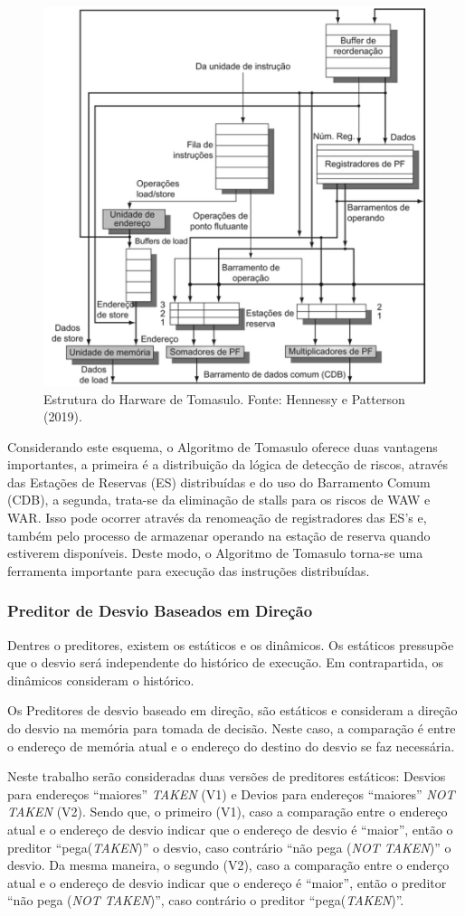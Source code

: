 \documentclass[12pt]{article}
\begin{document}
\begin{figure}[h]
  \centering
  \includegraphics[width=.6\textwidth]{img/fig_tomasulo.png}
  \caption{Estrutura do Harware de Tomasulo. Fonte: Hennessy e Patterson (2019).}
  \label{fig_tomasulo}
\end{figure}


Considerando este esquema, o Algoritmo de Tomasulo oferece duas vantagens importantes, a primeira é a distribuição da lógica de detecção de riscos, através das Estações de Reservas (ES) distribuídas e do uso do Barramento Comum (CDB), a segunda, trata-se da eliminação de stalls para os riscos de WAW e WAR. Isso pode ocorrer através da renomeação de registradores das ES's e, também pelo processo de armazenar operando na estação de reserva quando estiverem disponíveis. Deste modo, o Algoritmo de Tomasulo torna-se uma ferramenta importante para execução das instruções distribuídas.

\subsubsection{Preditor de Desvio Baseados em Direção} \label{sec:secao_desvio}

Dentres o preditores, existem os estáticos e os dinâmicos. Os estáticos pressupõe que o desvio será independente do histórico de execução. Em contrapartida, os dinâmicos consideram o histórico.

Os Preditores de desvio baseado em direção, são estáticos e consideram a direção do desvio na memória para tomada de decisão. Neste caso, a comparação é entre o endereço de memória atual e o endereço do destino do desvio se faz necessária.

Neste trabalho serão consideradas duas versões de preditores estáticos: Desvios para endereços ``maiores'' \textit{TAKEN} (V1) e Devios para endereços ``maiores'' \textit{NOT TAKEN} (V2). Sendo que, o primeiro (V1), caso a comparação entre o endereço atual e o endereço de desvio indicar que o endereço de desvio é ``maior'', então o preditor ``pega(\textit{TAKEN})'' o desvio, caso contrário ``não pega (\textit{NOT TAKEN})'' o desvio. Da mesma maneira, o segundo (V2), caso a comparação entre o enderço atual e o endereço de desvio indicar que o endereço é ``maior'', então o preditor ``não pega (\textit{NOT TAKEN})'', caso contrário o preditor ``pega(\textit{TAKEN})''.
\end{document}
